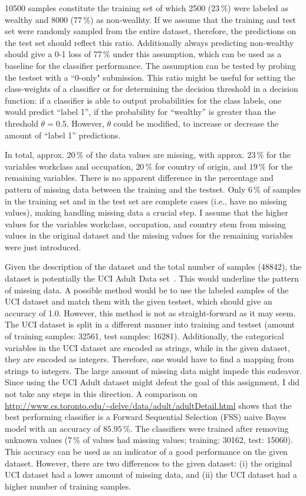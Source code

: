 \documentclass{article}
\begin{document}
10500 samples constitute the training set of which 2500 (23\,\%) were labeled as wealthy and 8000 (77\,\%) as non-wealhty. If we assume that the training and test set were randomly sampled from the entire dataset, therefore, the predictions on the test set should reflect this ratio. Additionally always predicting non-wealthy should give a 0-1 loss of 77\,\% under this assumption, which can be used as a baseline for the classifier performance. The assumption can be tested by probing the testset with a ``0-only" submission. This ratio might be useful for setting the class-weights of a classifier or for determining the decision threshold in a decision function: if a classifier is able to output probabilities for the class labels, one would predict ``label 1'', if the probability for ``wealthy'' is greater than the threshold $\theta = 0.5$. However, $\theta$ could be modified, to increase or decrease the amount of ``label 1'' predictions.

In total, approx. $20\,\%$ of the data values are missing, with approx. $23\,\%$ for the variables workclass and occupation, $20\,\%$ for country of origin, and $19\,\%$ for the remaining variables. There is no apparent difference in the percentage and pattern of missing data between the training and the testset. Only $6\,\%$ of samples in the training set and in the test set are complete cases (i.e., have no missing values), making handling missing data a crucial step. I assume that the higher values for the variables workclass, occupation, and country stem from missing values in the original dataset and the missing values for the remaining variables were just introduced. 

Given the description of the dataset and the total number of samples (48842), the dataset is potentially the UCI Adult Data set~\cite{lichman2013}. This would underline the pattern of missing data. A possible method would be to use the labeled samples of the UCI dataset and match them with the given testset, which should give an accuracy of 1.0. However, this method is not as straight-forward as it may seem. The UCI dataset is split in a different manner into training and testset (amount of training samples: 32561, test samples: 16281). Additionally, the categorical variables in the UCI dataset are encoded as strings, while in the given dataset, they are encoded as integers. Therefore, one would have to find a mapping from strings to integers. The large amount of missing data might impede this endeavor. Since using the UCI Adult dataset might defeat the goal of this assignment, I did not take any steps in this direction. A comparison on \url{http://www.cs.toronto.edu/~delve/data/adult/adultDetail.html} shows that the best performing classifier is a Forward Sequential Selection (FSS) naive Bayes model with an accuracy of $85.95\,\%$. The classifiers were trained after removing unknown values (7\,\% of values had missing values; training: 30162, test: 15060). This accuracy can be used as an indicator of a good performance on the given dataset. However, there are two differences to the given dataset: (i) the original UCI dataset had a lower amount of missing data, and (ii) the UCI dataset had a higher number of training samples.
\end{document}
